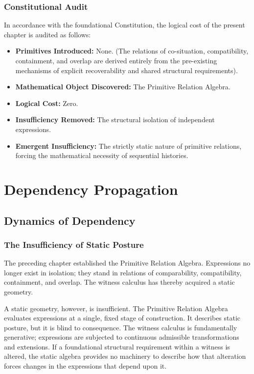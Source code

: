 \documentclass[12pt,anyside]{book}
\begin{document}
\subsection{Constitutional Audit}
In accordance with the foundational Constitution, the logical cost of the present chapter is audited as follows:
\begin{itemize}
    \item \textbf{Primitives Introduced:} None. (The relations of co-situation, compatibility, containment, and overlap are derived entirely from the pre-existing mechanisms of explicit recoverability and shared structural requirements).
    \item \textbf{Mathematical Object Discovered:} The Primitive Relation Algebra.
    \item \textbf{Logical Cost:} Zero.
    \item \textbf{Insufficiency Removed:} The structural isolation of independent expressions.
    \item \textbf{Emergent Insufficiency:} The strictly static nature of primitive relations, forcing the mathematical necessity of sequential histories.
\end{itemize}


\chapter{Dependency Propagation}
\setlength{\parindent}{0pt}

\section{Dynamics of Dependency}

\subsection{The Insufficiency of Static Posture}
The preceding chapter established the Primitive Relation Algebra. Expressions no longer exist in isolation; they stand in relations of comparability, compatibility, containment, and overlap. The witness calculus has thereby acquired a static geometry.

A static geometry, however, is insufficient. The Primitive Relation Algebra evaluates expressions at a single, fixed stage of construction. It describes static posture, but it is blind to consequence. The witness calculus is fundamentally generative; expressions are subjected to continuous admissible transformations and extensions. If a foundational structural requirement within a witness is altered, the static algebra provides no machinery to describe how that alteration forces changes in the expressions that depend upon it. 
\end{document}
